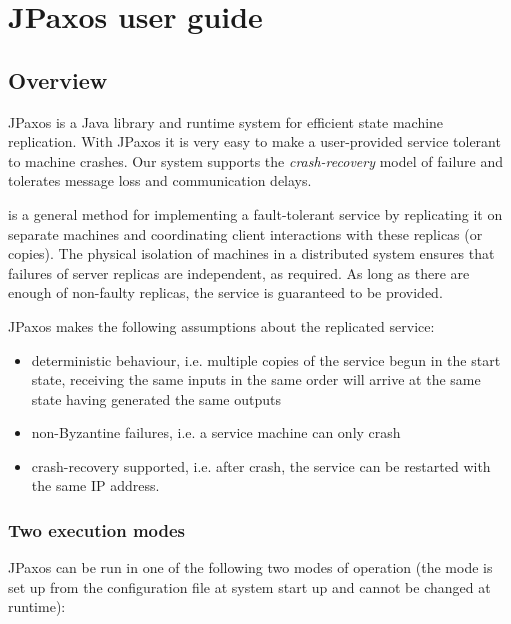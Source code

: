 \chapter{JPaxos user guide}

\section{Overview}
\label{overview:overview}\label{overview::doc}\label{overview:jpaxos-user-guide}
JPaxos is a Java library and runtime system for efficient state machine
replication. With JPaxos it is very easy to make a user-provided
service tolerant to machine crashes. Our system supports the \emph{crash-recovery}
model of failure and tolerates message loss and communication delays.
\begin{description}
\item[{\href{http://en.wikipedia.org/wiki/State\_machine\_replication}{State machine replication}}] \leavevmode{}\label{overview:term-state-machine-replication}
is a general method for implementing a fault-tolerant service by
replicating it on separate machines and coordinating client interactions
with these replicas (or copies). The physical isolation of machines in
a distributed system ensures that failures of server replicas are
independent, as required. As long as there are enough of non-faulty
replicas, the service is guaranteed to be provided.

\end{description}

JPaxos makes the following assumptions about the replicated service:
\begin{itemize}
\item {} 
deterministic behaviour, i.e. multiple copies of the service begun in
the start state, receiving the same inputs in the same order will
arrive at the same state having generated the same outputs

\item {} 
non-Byzantine failures, i.e. a service machine can only crash

\item {} 
crash-recovery supported, i.e. after crash, the service can be restarted
with the same IP address.

\end{itemize}


\subsection{Two execution modes}
\label{overview:two-execution-modes}
JPaxos can be run in one of the following two modes of operation
(the mode is set up from the configuration file at system start up
and cannot be changed at runtime):

